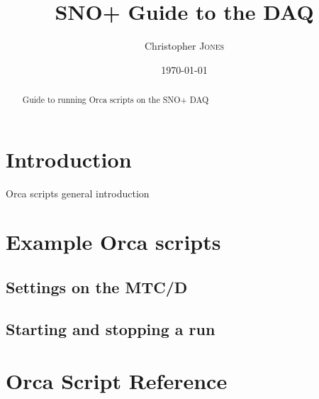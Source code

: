\documentclass[12pt,preprint]{article}
\title{SNO+ Guide to the DAQ} %
\author{Christopher \textsc{Jones}} %
\date{\today} %
\begin{document}
\maketitle %

\begin{abstract}
\noindent
Guide to running Orca scripts on the SNO+ DAQ 
\end{abstract}

\section{Introduction}\normalsize
Orca scripts general introduction

\section{Example Orca scripts}
\subsection{Settings on the MTC/D}
\subsection{Starting and stopping a run}

\section{Orca Script Reference}
\end{document}

